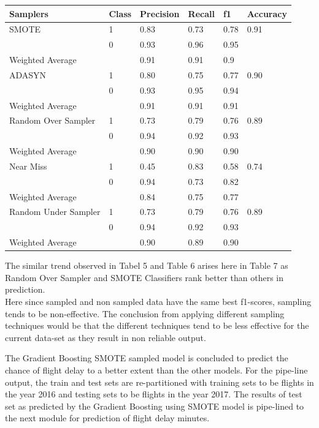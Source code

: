 \documentclass{article}
\begin{document}
\break
\begin{center}
 \label{tab:title} 

\begin{tabular}{ |p{2cm}|p{1cm}|p{2cm}|p{1cm}|p{1cm}|p{2cm}| }
 \hline
 Samplers & Class & Precision & Recall & f1 & Accuracy\\
 \hline
 SMOTE  & 1  & 0.83 & 0.73 & 0.78 & 0.91 \\
        & 0  & 0.93 & 0.96 & 0.95 &  \\
\hline
 Weighted Average & & 0.91 & 0.91 & 0.9 &  \\
 \hline
 \hline
 ADASYN   & 1  & 0.80 & 0.75 & 0.77 & 0.90 \\
          & 0  & 0.93 & 0.95 & 0.94 & \\
\hline
 Weighted Average & & 0.91 & 0.91 & 0.91 & \\
 \hline
 \hline
 Random Over Sampler  & 1  & 0.73 & 0.79 & 0.76 & 0.89\\
               & 0  & 0.94 & 0.92 & 0.93 & \\
\hline
 Weighted Average & & 0.90 & 0.90 & 0.90 & \\
 \hline
 \hline
 Near Miss  & 1  & 0.45 & 0.83 & 0.58 & 0.74\\
               & 0  & 0.94 & 0.73 & 0.82 & \\
\hline
 Weighted Average & & 0.84 & 0.75 & 0.77 & \\
 \hline
 \hline
 Random Under Sampler  & 1  & 0.73 & 0.79 & 0.76 & 0.89\\
               & 0  & 0.94 & 0.92 & 0.93 & \\
\hline
 Weighted Average & & 0.90 & 0.89 & 0.90 & \\
 \hline
\end{tabular}

\end{center}

The similar trend observed in Tabel 5 and Table 6 arises here in Table 7 as Random Over Sampler and SMOTE Classifiers rank better than others in prediction.\\

Here since sampled and non sampled data have the same best f1-scores, sampling tends to be non-effective.
The conclusion from applying different sampling techniques would be that the different techniques tend to be less effective for the current data-set as they result in non reliable output.

The Gradient Boosting SMOTE sampled model is concluded to predict the chance of flight delay to a better extent than the other models. For the pipe-line output, the train and test sets are re-partitioned with training sets to be flights in the year 2016 and testing sets to be flights in the year 2017. The results of test set as predicted by the Gradient Boosting using SMOTE model is pipe-lined to the next module for prediction of flight delay minutes.
\end{document}
